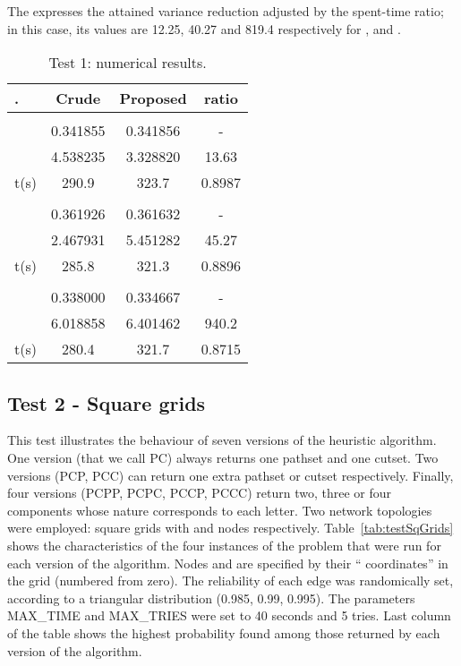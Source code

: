\documentclass[a4paper]{article}
\begin{document}
The  expresses the attained variance reduction adjusted by the spent-time ratio; in this case, its values are 12.25, 40.27 and 819.4 respectively for ,  and .


\begin{table}
\begin{center} \small
\begin{tabular}{ | l | c | c | c | }
\hline
. & Crude &  Proposed &  ratio \\ \hline \hline
 \\ \hline \hline
\quad  &  0.341855  &  0.341856  &  - \\ \hline
\quad  & 4.538235 & 3.328820 & 13.63 \\ \hline
\quad t(s) & 290.9 &  323.7  & 0.8987 \\ \hline
 \\ \hline \hline
\quad  &  0.361926  &  0.361632  &  - \\ \hline
\quad  & 2.467931 & 5.451282 & 45.27 \\ \hline
\quad t(s) & 285.8 &  321.3  & 0.8896 \\ \hline
 \\ \hline \hline
\quad  &  0.338000  &  0.334667  &  - \\ \hline
\quad  & 6.018858 & 6.401462 & 940.2 \\ \hline
\quad t(s) & 280.4 &  321.7  & 0.8715 \\ \hline
\end{tabular}
\end{center}
\caption{Test 1: numerical results.}
\label{tab:results-case-1}
\end{table}








\subsection{Test 2 - Square grids} \label{ss:squaregrids}

This test illustrates the behaviour of seven versions of the heuristic algorithm. One version (that we call PC) always returns one pathset and one cutset. Two versions (PCP, PCC) can return one extra pathset or cutset respectively. Finally, four versions (PCPP, PCPC, PCCP, PCCC) return two, three or four components whose nature corresponds to each letter. Two network topologies were employed: square grids with  and  nodes respectively. Table~\ref{tab:testSqGrids} shows the characteristics of the four instances of the problem that were run for each version of the algorithm. Nodes  and  are specified by their `` coordinates'' in the grid (numbered from zero). The reliability of each edge was randomically set, according to a triangular distribution (0.985, 0.99, 0.995). The parameters MAX\_TIME and MAX\_TRIES were set to 40 seconds and 5 tries. Last column of the table shows the highest probability found among those returned by each version of the algorithm. 
\end{document}
